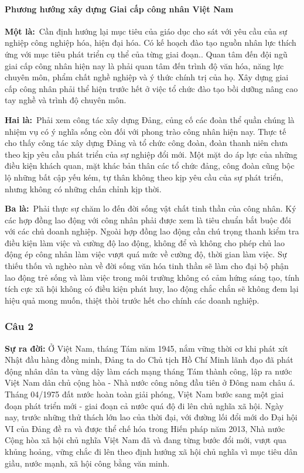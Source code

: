 \paragraph*{{\textbf{Phương hướng xây dựng Giai cấp công nhân Việt Nam}}}\mbox{}

\textbf{Một là:} Cần định hướng lại mục tiêu của giáo dục cho sát với yêu cầu của sự nghiệp công nghiệp hóa, hiện đại hóa. Có kế hoạch đào tạo nguồn nhân lực thích ứng với mục tiêu phát triển cụ thể của từng giai đoạn.. Quan tâm đến đội ngũ giai cấp công nhân hiện nay là phải quan tâm đến trình độ văn hóa, năng lực chuyên môn, phẩm chất nghề nghiệp và ý thức chính trị của họ. Xây dựng giai cấp công nhân phải thể hiện trước hết ở việc tổ chức đào tạo bồi dưỡng nâng cao tay nghề và trình độ chuyên môn. 

\textbf{Hai là:} Phải xem công tác xây dựng Đảng, củng cố các đoàn thể quần chúng là nhiệm vụ có ý nghĩa sống còn đối với phong trào công nhân hiện nay. Thực tế cho thấy công tác xây dựng Đảng và tổ chức công đoàn, đoàn thanh niên chưa theo kịp yêu cầu phát triển của sự nghiệp đổi mới. Một mặt do áp lực của những điều kiện khách quan, mặt khác bản thân các tổ chức đảng, công đoàn cũng bộc lộ những bất cập yếu kém, tự thân không theo kịp yêu cầu của sự phát triển, nhưng không có những chấn chỉnh kịp thời.

\textbf{Ba là:} Phải thực sự chăm lo đến đời sống vật chất tinh thần của công nhân. Ký các hợp đồng lao động với công nhân phải được xem là tiêu chuẩn bắt buộc đối với các chủ doanh nghiệp. Ngoài hợp đồng lao động cần chú trọng thanh kiểm tra điều kiện làm việc và cường độ lao động, không để và không cho phép chủ lao động ép công nhân làm việc vượt quá mức về cường độ, thời gian làm việc. Sự thiếu thốn và nghèo nàn về đời sống văn hóa tinh thần sẽ làm cho đại bộ phận lao động trẻ sống và làm việc trong môi trường không có cảm hứng sáng tạo, tính tích cực xã hội không có điều kiện phát huy, lao động chắc chắn sẽ không đem lại hiệu quả mong muốn, thiệt thòi trước hết cho chính các doanh nghiệp.
\subsubsection*{\fontsize{15pt}{0pt}\selectfont\textbf{Câu 2}}

\textbf{Sự ra đời: } Ở Việt Nam, tháng Tám năm 1945, nắm vững thời cơ khi phát xít Nhật đầu hàng đồng minh, Đảng ta do Chủ tịch Hồ Chí Minh lãnh đạo đã phát động nhân dân ta vùng dậy làm cách mạng tháng Tám thành công, lập ra nước Việt Nam dân chủ cộng hòa - Nhà nước công nông đầu tiên ở Đông nam châu á.  Tháng 04/1975 đất nước hoàn toàn giải phóng, Việt Nam bước sang một giai đoạn phát triển mới - giai đoạn cả nước quá độ đi lên chủ nghĩa xã hội. Ngày nay, trước những thử thách lớn lao của thời đại, với đường lối đổi mới do Đại hội VI của Đảng đề ra và được thể chế hóa trong Hiến pháp năm 2013, Nhà nước Cộng hòa xã hội chủ nghĩa Việt Nam đã và đang từng bước đổi mới, vượt qua khủng hoảng, vững chắc đi lên theo định hướng xã hội chủ nghĩa vì mục tiêu dân giầu, nước mạnh, xã hội công bằng văn minh.

